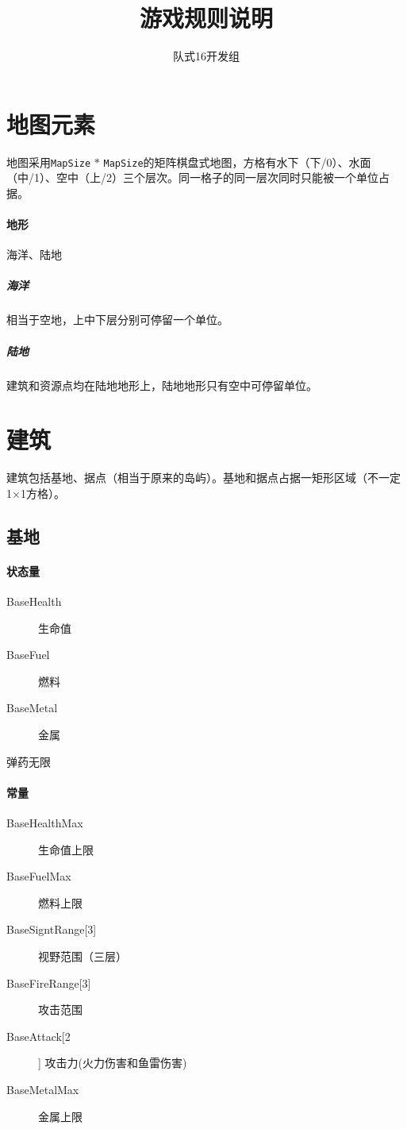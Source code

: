 \documentclass[11pt,a4paper]{article}
\begin{document}
  \title{游戏规则说明}
  \author{队式16开发组}
  \maketitle

  \section{地图元素}
    地图采用\texttt{MapSize} $*$ \texttt{MapSize}的矩阵棋盘式地图，方格有水下（下/0）、水面（中/1）、空中（上/2）三个层次。同一格子的同一层次同时只能被一个单位占据。

    \paragraph{地形} 海洋、陆地
      \subparagraph{海洋} 相当于空地，上中下层分别可停留一个单位。
      \subparagraph{陆地} 建筑和资源点均在陆地地形上，陆地地形只有空中可停留单位。


  \section{建筑}
    建筑包括基地、据点（相当于原来的岛屿）。基地和据点占据一矩形区域（不一定1×1方格）。

    \subsection{基地}
      \paragraph{状态量}
        \begin{minipage}[t]{0.6\textwidth}
          \begin{description}
            \item[BaseHealth] 生命值
            \item[BaseFuel] 燃料
            \item[BaseMetal] 金属
          \end{description}
          弹药无限
        \end{minipage}

      \paragraph{常量}
        \begin{minipage}[t]{0.6\textwidth}
          \begin{description}
            \item[BaseHealthMax] 生命值上限
            \item[BaseFuelMax] 燃料上限
            \item[{BaseSigntRange[3]}] 视野范围（三层）
            \item[{BaseFireRange[3]}] 攻击范围
            \item[BaseAttack[2]] 攻击力(火力伤害和鱼雷伤害)
            \item[BaseMetalMax] 金属上限
          \end{description}
        \end{minipage}
\end{document}
